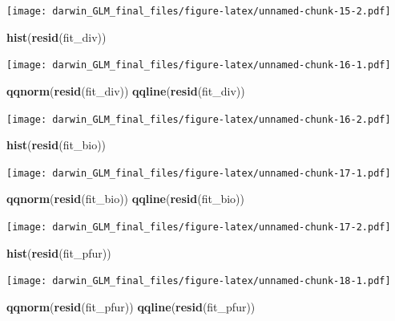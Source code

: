 \documentclass[]{article}
\newenvironment{Shaded}{\begin{snugshade}}{\end{snugshade}}
\newcommand{\KeywordTok}[1]{\textcolor[rgb]{0.13,0.29,0.53}{\textbf{#1}}}
\newcommand{\NormalTok}[1]{#1}
\begin{document}
\texttt{[image: darwin\_GLM\_final\_files/figure-latex/unnamed-chunk-15-2.pdf]}

\begin{Shaded}
\begin{Highlighting}[]
\KeywordTok{hist}\NormalTok{(}\KeywordTok{resid}\NormalTok{(fit_div))}
\end{Highlighting}
\end{Shaded}

\texttt{[image: darwin\_GLM\_final\_files/figure-latex/unnamed-chunk-16-1.pdf]}

\begin{Shaded}
\begin{Highlighting}[]
\KeywordTok{qqnorm}\NormalTok{(}\KeywordTok{resid}\NormalTok{(fit_div))}
\KeywordTok{qqline}\NormalTok{(}\KeywordTok{resid}\NormalTok{(fit_div))}
\end{Highlighting}
\end{Shaded}

\texttt{[image: darwin\_GLM\_final\_files/figure-latex/unnamed-chunk-16-2.pdf]}

\begin{Shaded}
\begin{Highlighting}[]
\KeywordTok{hist}\NormalTok{(}\KeywordTok{resid}\NormalTok{(fit_bio))}
\end{Highlighting}
\end{Shaded}

\texttt{[image: darwin\_GLM\_final\_files/figure-latex/unnamed-chunk-17-1.pdf]}

\begin{Shaded}
\begin{Highlighting}[]
\KeywordTok{qqnorm}\NormalTok{(}\KeywordTok{resid}\NormalTok{(fit_bio))}
\KeywordTok{qqline}\NormalTok{(}\KeywordTok{resid}\NormalTok{(fit_bio))}
\end{Highlighting}
\end{Shaded}

\texttt{[image: darwin\_GLM\_final\_files/figure-latex/unnamed-chunk-17-2.pdf]}

\begin{Shaded}
\begin{Highlighting}[]
\KeywordTok{hist}\NormalTok{(}\KeywordTok{resid}\NormalTok{(fit_pfur))}
\end{Highlighting}
\end{Shaded}

\texttt{[image: darwin\_GLM\_final\_files/figure-latex/unnamed-chunk-18-1.pdf]}

\begin{Shaded}
\begin{Highlighting}[]
\KeywordTok{qqnorm}\NormalTok{(}\KeywordTok{resid}\NormalTok{(fit_pfur))}
\KeywordTok{qqline}\NormalTok{(}\KeywordTok{resid}\NormalTok{(fit_pfur))}
\end{Highlighting}
\end{Shaded}
\end{document}
